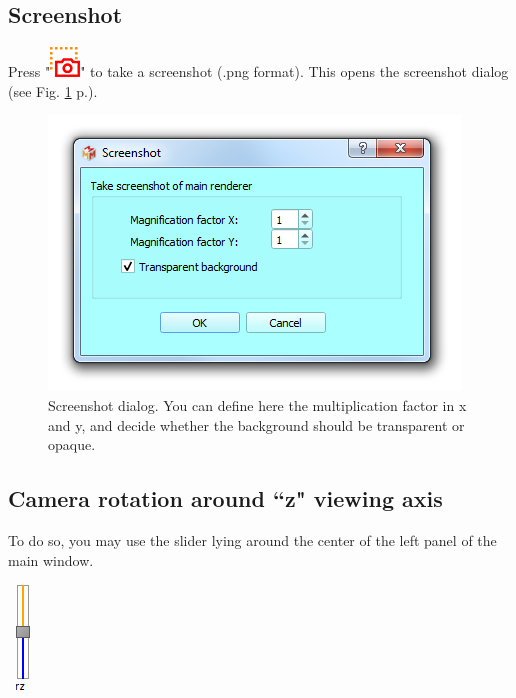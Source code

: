 \subsection{Screenshot}
Press "\includegraphics[scale=0.7]{images/06/camera/screenshot.png}" to take a screenshot (.png format). This opens the screenshot dialog (see Fig. \ref{screenshot_dialog} p.\pageref{screenshot_dialog}). 

\begin{figure}
  \centering
  \includegraphics[scale=0.4]{images/06/camera/screenshot_dialog.png} 
	\caption{Screenshot dialog. You can define here the multiplication factor in x and y, and decide whether the background should be transparent or opaque. }
\label{screenshot_dialog}
 
\end{figure}


\subsection{Camera rotation around ``z" viewing axis}

\begin{minipage}{0.7\textwidth}
To do so, you may use the slider lying around the center of the left panel of the main window.
\end{minipage}    
\begin{minipage}{0.25\textwidth}\centering
  \includegraphics[scale=0.7]{images/06/camera/rz_cam.png}
 \end{minipage}    



